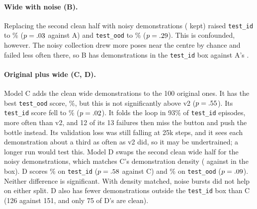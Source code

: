 \documentclass[10pt,twocolumn,letterpaper]{article}
\newcommand{\ttt}[1]{\texttt{\small #1}}
\begin{document}
\paragraph{Wide with noise (B).} Replacing the second clean half with noisy demonstrations (\CollNoise{} kept)
raised \ttt{test\_id} to \BId\% ($p = .03$ against A) and \ttt{test\_ood} to \BOod\% ($p
= .29$). This is confounded, however. The noisy collection drew more poses near the centre by chance
and failed less often there, so B has \BInBox{} demonstrations in the \ttt{test\_id} box against A's \AInBox.

\paragraph{Original plus wide (C, D).} Model C adds the \ADemos{} clean wide demonstrations to the 100
original ones. It has the best \ttt{test\_ood} score, \COod\%, but this is not significantly above v2 ($p
= .55$). Its \ttt{test\_id} score fell to \CId\% ($p = .02$). It folds the loop in 93\% of \ttt{test\_id}
episodes, more often than v2, and 12 of its 13 failures then miss the button and push the bottle instead. Its
validation loss was still falling at 25k steps, and it sees each demonstration about a third as often as v2
did, so it may be undertrained; a longer run would test this. Model D swaps the second clean wide half for the noisy demonstrations,
which matches C's demonstration density (\DInBox{} against \CInBox{} in the box). D scores \DId\% on
\ttt{test\_id} ($p = .58$ against C) and \DOod\% on \ttt{test\_ood} ($p = .09$). Neither
difference is significant. With density matched, noise bursts did not help on either split. D also has fewer
demonstrations outside the \ttt{test\_id} box than C (126 against 151, and only 75 of D's are clean).
\end{document}
